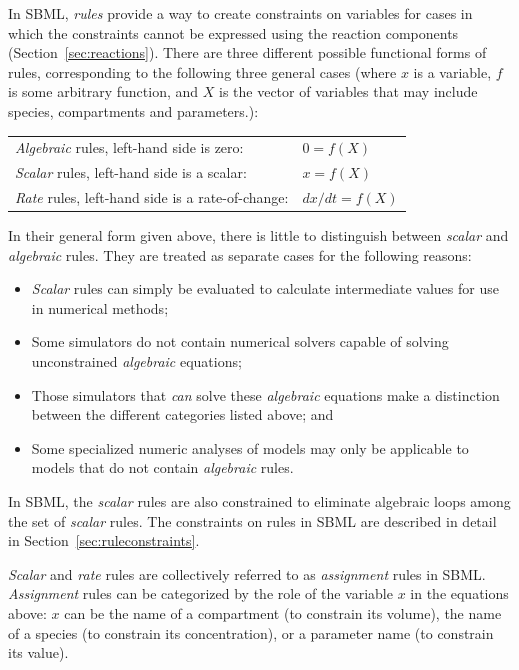 \documentclass[10pt,twocolumntoc]{cekarticle}
\begin{document}
In SBML, \emph{rules} provide a way to create constraints on variables for
cases in which the constraints cannot be expressed using the reaction
components (Section~\ref{sec:reactions}). There are three different
possible functional forms of rules, corresponding to the following three
general cases (where $x$ is a variable, $f$ is some arbitrary function, and
$X$ is the vector of variables that may include species, compartments and
parameters.):

\begin{center}
\begin{tabular}{ll}
  \emph{Algebraic} rules, left-hand side is zero:             & $0 = f(X)$\\
  \emph{Scalar} rules, left-hand side is a scalar:         & $x = f(X)$\\
  \emph{Rate} rules, left-hand side is a rate-of-change: & $dx/dt = f(X)$
\end{tabular}
\end{center}

In their general form given above, there is little to distinguish between
\emph{scalar} and \emph{algebraic} rules.  They are treated as separate
cases for the following reasons:
\begin{itemize}
  
\item \emph{Scalar} rules can simply be evaluated to calculate intermediate
  values for use in numerical methods;
  
\item Some simulators do not contain numerical solvers capable of solving
  unconstrained \emph{algebraic} equations;
  
\item Those simulators that \emph{can} solve these \emph{algebraic}
  equations make a distinction between the different categories listed
  above; and
  
\item Some specialized numeric analyses of models may only be applicable to
  models that do not contain \emph{algebraic} rules.
\end{itemize}

In SBML, the \emph{scalar} rules are also constrained to eliminate
algebraic loops among the set of \emph{scalar} rules.  The constraints on
rules in SBML are described in detail in Section~\ref{sec:ruleconstraints}.

\emph{Scalar} and \emph{rate} rules are collectively referred to as
\emph{assignment} rules in SBML.  \emph{Assignment} rules can be
categorized by the role of the variable $x$ in the equations above: $x$ can
be the name of a compartment (to constrain its volume), the name of a
species (to constrain its concentration), or a parameter name (to constrain
its value).
\end{document}

